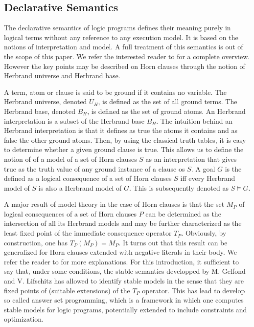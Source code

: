 \subsection{Declarative Semantics}

The declarative semantics of logic programs defines their meaning
purely in logical terms without any reference to any execution
model. It is based on the notions of interpretation and model. A full
treatment of this semantics is out of the scope of this paper. We
refer the interested reader to \cite{Lloyd} for a complete
overview. However the key points may be described on Horn clauses
through the notion of Herbrand universe and Herbrand base.

A term, atom or clause is said to be ground if it contains no
variable. The Herbrand universe, denoted $U_H$, is defined as the set
of all ground terms. The Herbrand base, denoted $B_H$, is defined as
the set of ground atoms.
An Herbrand interpretation is a subset of the Herbrand base $B_H$.
The intuition behind an Herbrand interpretation is that it defines as
true the atoms it contains and as false the other ground atoms. Then,
by using the classical truth tables, it is easy to determine whether a
given ground clause is true. This allows us to define the notion of of a model of a set of Horn clauses $S$ as an interpretation that gives true as the truth value 
of any ground instance of a clause os $S$. 
A goal $G$ is the defined as a logical consequence of a set of Horn clauses $S$ iff
every Herbrand model of $S$ is also a Herbrand model of $G$. This is
subsequently denoted as $S \models G$.

A major result of model theory in the case of Horn clauses is that the
set $M_P$ of logical consequences of a set of Horn clauses $P$ can be determined
as the intersection of all its Herbrand models and may be further
characterized as the least fixed point of the immediate consequence
operator $T_P$.
Obviously, by construction, one has $T_P(M_P) = M_P$. It turns out
that this result can be generalized for Horn clauses extended with
negative literals in their body. We refer the reader to \cite{AptBol} for
more explanations. For this introduction, it sufficient to say that,
under some conditions, the stable semantics developped by M. Gelfond
and V. Lifschitz has allowed to identify stable models in the sense
that they are fixed points of (suitable extensions) of the $T_P$
operator. This has lead to develop so called answer set programming,
which is a framework in which one computes stable models for logic
programs, potentially extended to include constraints and optimization.


